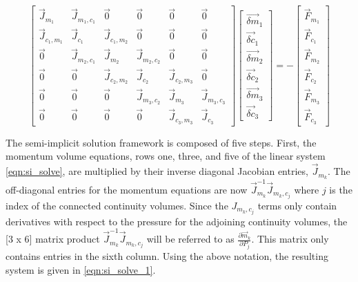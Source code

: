  \begin{equation}
 \label{eqn:si_solve}
 \begin{bmatrix} 
 \vec{J}_{m_1} & \vec{J}_{m_1,c_1} & \vec{0} & \vec{0} & \vec{0} & \vec{0}\\
 \vec{J}_{c_1,m_1} & \vec{J}_{c_1} & \vec{J}_{c_1,m_2} & \vec{0} & \vec{0} & \vec{0} \\
 \vec{0} & \vec{J}_{m_2,c_1} & \vec{J}_{m_2} & \vec{J}_{m_2,c_2} & \vec{0} & \vec{0} \\
 \vec{0} & \vec{0} & \vec{J}_{c_2,m_2} & \vec{J}_{c_2} & \vec{J}_{c_2,m_3} & \vec{0} \\
 \vec{0} & \vec{0} & \vec{0} & \vec{J}_{m_3,c_2} & \vec{J}_{m_3} & \vec{J}_{m_3,c_3} \\ 
 \vec{0} & \vec{0} & \vec{0} & \vec{0} & \vec{J}_{c_3,m_3} & \vec{J}_{c_3}  
 \end{bmatrix} \begin{bmatrix}
 \vec{\delta m}_{1} \\ \vec{\delta c}_{1} \\
 \vec{\delta m}_{2} \\ \vec{\delta c}_{2} \\
 \vec{\delta m}_{3} \\ \vec{\delta c}_{3}
\end{bmatrix}  = -\begin{bmatrix}
 \vec{F}_{m_1} \\ \vec{F}_{c_1} \\
 \vec{F}_{m_2} \\ \vec{F}_{c_2} \\
 \vec{F}_{m_3} \\ \vec{F}_{c_3} \end{bmatrix}
 \end{equation}
 
 The semi-implicit solution framework is composed of five steps.
 First, the momentum volume equations, rows one, three, and five of the linear system \eqref{eqn:si_solve}, are multiplied by their inverse diagonal Jacobian entries, $\vec{J}_{m_k}$.
 The off-diagonal entries for the momentum equations are now $\vec{J}^{-1}_{m_k}\vec{J}_{m_k,c_j}$ where $j$ is the index of the connected continuity volumes.
 Since the $J_{m_k,c_j}$ terms only contain derivatives with respect to the pressure for the adjoining continuity volumes, the [3 x 6] matrix product $\vec{J}^{-1}_{m_k}\vec{J}_{m_k,c_j}$ will be referred to as $\frac{\partial \vec{m}_k}{\partial P_j}$.
 This matrix only contains entries in the sixth column.
 Using the above notation, the resulting system is given in \eqref{eqn:si_solve_1}.
 
